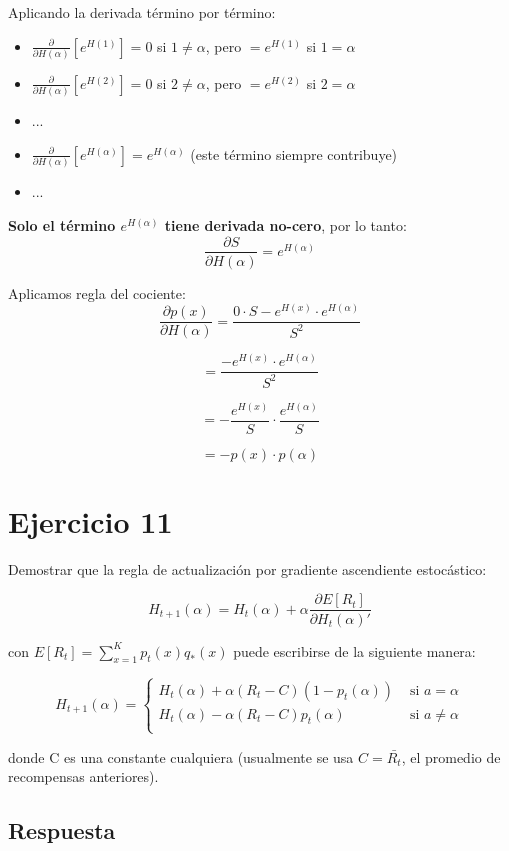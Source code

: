 \documentclass[12pt,a4paper]{article}
\begin{document}
Aplicando la derivada término por término:
\begin{itemize}
    \item $\frac{\partial}{\partial H(\alpha)}[e^{H(1)}] = 0$ si $1 \neq \alpha$, pero $= e^{H(1)}$ si $1 = \alpha$
    \item $\frac{\partial}{\partial H(\alpha)}[e^{H(2)}] = 0$ si $2 \neq \alpha$, pero $= e^{H(2)}$ si $2 = \alpha$
    \item ...
    \item $\frac{\partial}{\partial H(\alpha)}[e^{H(\alpha)}] = e^{H(\alpha)}$ (este término siempre contribuye)
    \item ...
\end{itemize}

\textbf{Solo el término $e^{H(\alpha)}$ tiene derivada no-cero}, por lo tanto:
$$\frac{\partial S}{\partial H(\alpha)} = e^{H(\alpha)}$$

Aplicamos regla del cociente:
$$\frac{\partial p(x)}{\partial H(\alpha)} = \frac{0 \cdot S - e^{H(x)} \cdot e^{H(\alpha)}}{S^2}$$

$$= \frac{-e^{H(x)} \cdot e^{H(\alpha)}}{S^2}$$

$$= -\frac{e^{H(x)}}{S} \cdot \frac{e^{H(\alpha)}}{S}$$

$$= -p(x) \cdot p(\alpha)$$

\section{Ejercicio 11}

Demostrar que la regla de actualización por gradiente ascendiente
estocástico:

$$ H_{t+1}(\alpha) = H_t(\alpha) + \alpha \frac{\partial E[R_t]}{\partial H_t(\alpha)'}$$

con $E[R_t] = \sum_{x=1}^{K} p_t(x)q_*(x)$ puede escribirse de la siguiente manera:

$$ H_{t+1}(\alpha) = 
\begin{cases} 
    H_t(\alpha) + \alpha (R_t - C)(1 - p_t(\alpha)) & \text{ si } a = \alpha \\
    H_t(\alpha) - \alpha (R_t - C)p_t(\alpha) & \text{ si } a \neq \alpha \\
\end{cases} $$

donde C es una constante cualquiera (usualmente se usa $C = \bar{R_t}$,
el promedio de recompensas anteriores).

\subsection{Respuesta}
\end{document}
